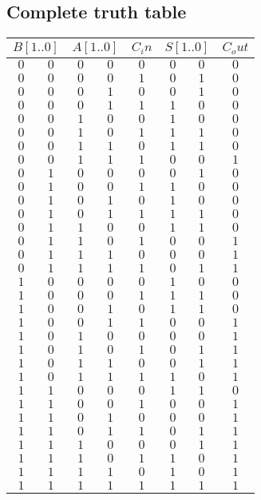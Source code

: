 \documentclass [15pt,a4paper,twoside]{article}
\begin{document}
\subsection{Complete truth table}
\begin{center}
\begin{tabular}{ccccc|ccc}
\multicolumn{2}{c}{$B[1..0]$}&\multicolumn{2}{c}{$A[1..0]$}&$C_in$&\multicolumn{2}{c}{$S[1..0]$}&$C_out$\\
\hline
$0$&$0$&$0$&$0$&$0$&$0$&$0$&$0$\\
$0$&$0$&$0$&$0$&$1$&$0$&$1$&$0$\\
$0$&$0$&$0$&$1$&$0$&$0$&$1$&$0$\\
$0$&$0$&$0$&$1$&$1$&$1$&$0$&$0$\\
$0$&$0$&$1$&$0$&$0$&$1$&$0$&$0$\\
$0$&$0$&$1$&$0$&$1$&$1$&$1$&$0$\\
$0$&$0$&$1$&$1$&$0$&$1$&$1$&$0$\\
$0$&$0$&$1$&$1$&$1$&$0$&$0$&$1$\\
$0$&$1$&$0$&$0$&$0$&$0$&$1$&$0$\\
$0$&$1$&$0$&$0$&$1$&$1$&$0$&$0$\\
$0$&$1$&$0$&$1$&$0$&$1$&$0$&$0$\\
$0$&$1$&$0$&$1$&$1$&$1$&$1$&$0$\\
$0$&$1$&$1$&$0$&$0$&$1$&$1$&$0$\\
$0$&$1$&$1$&$0$&$1$&$0$&$0$&$1$\\
$0$&$1$&$1$&$1$&$0$&$0$&$0$&$1$\\
$0$&$1$&$1$&$1$&$1$&$0$&$1$&$1$\\
$1$&$0$&$0$&$0$&$0$&$1$&$0$&$0$\\
$1$&$0$&$0$&$0$&$1$&$1$&$1$&$0$\\
$1$&$0$&$0$&$1$&$0$&$1$&$1$&$0$\\
$1$&$0$&$0$&$1$&$1$&$0$&$0$&$1$\\
$1$&$0$&$1$&$0$&$0$&$0$&$0$&$1$\\
$1$&$0$&$1$&$0$&$1$&$0$&$1$&$1$\\
$1$&$0$&$1$&$1$&$0$&$0$&$1$&$1$\\
$1$&$0$&$1$&$1$&$1$&$1$&$0$&$1$\\
$1$&$1$&$0$&$0$&$0$&$1$&$1$&$0$\\
$1$&$1$&$0$&$0$&$1$&$0$&$0$&$1$\\
$1$&$1$&$0$&$1$&$0$&$0$&$0$&$1$\\
$1$&$1$&$0$&$1$&$1$&$0$&$1$&$1$\\
$1$&$1$&$1$&$0$&$0$&$0$&$1$&$1$\\
$1$&$1$&$1$&$0$&$1$&$1$&$0$&$1$\\
$1$&$1$&$1$&$1$&$0$&$1$&$0$&$1$\\
$1$&$1$&$1$&$1$&$1$&$1$&$1$&$1$\\

\end{tabular}
\end{center}
\end{document}

